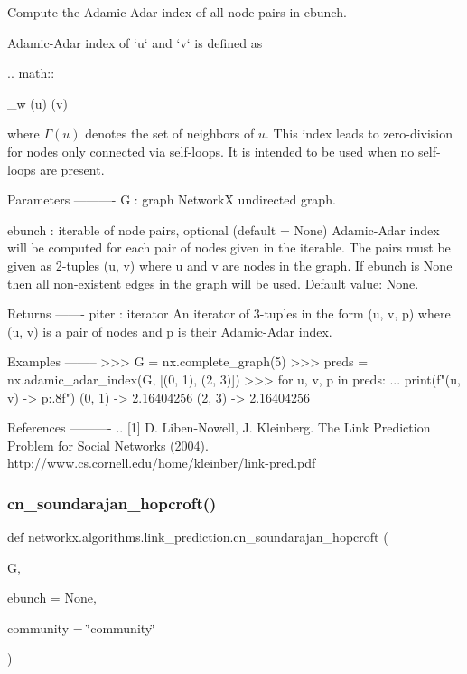 \begin{DoxyVerb}Compute the Adamic-Adar index of all node pairs in ebunch.

Adamic-Adar index of `u` and `v` is defined as

.. math::

    \sum_{w \in \Gamma(u) \cap \Gamma(v)} 

where $\Gamma(u)$ denotes the set of neighbors of $u$.
This index leads to zero-division for nodes only connected via self-loops.
It is intended to be used when no self-loops are present.

Parameters
----------
G : graph
    NetworkX undirected graph.

ebunch : iterable of node pairs, optional (default = None)
    Adamic-Adar index will be computed for each pair of nodes given
    in the iterable. The pairs must be given as 2-tuples (u, v)
    where u and v are nodes in the graph. If ebunch is None then all
    non-existent edges in the graph will be used.
    Default value: None.

Returns
-------
piter : iterator
    An iterator of 3-tuples in the form (u, v, p) where (u, v) is a
    pair of nodes and p is their Adamic-Adar index.

Examples
--------
>>> G = nx.complete_graph(5)
>>> preds = nx.adamic_adar_index(G, [(0, 1), (2, 3)])
>>> for u, v, p in preds:
...     print(f"({u}, {v}) -> {p:.8f}")
(0, 1) -> 2.16404256
(2, 3) -> 2.16404256

References
----------
.. [1] D. Liben-Nowell, J. Kleinberg.
       The Link Prediction Problem for Social Networks (2004).
       http://www.cs.cornell.edu/home/kleinber/link-pred.pdf
\end{DoxyVerb}
 \mbox{\label{namespacenetworkx_1_1algorithms_1_1link__prediction_a9c5018917b79b89c1f4ad087731d7f10}} 
\subsubsection{\texorpdfstring{cn\+\_\+soundarajan\+\_\+hopcroft()}{cn\_soundarajan\_hopcroft()}}
{\footnotesize\ttfamily def networkx.\+algorithms.\+link\+\_\+prediction.\+cn\+\_\+soundarajan\+\_\+hopcroft (\begin{DoxyParamCaption}\item[{}]{G,  }\item[{}]{ebunch = {\ttfamily None},  }\item[{}]{community = {\ttfamily \char`\"{}community\char`\"{}} }\end{DoxyParamCaption})}

